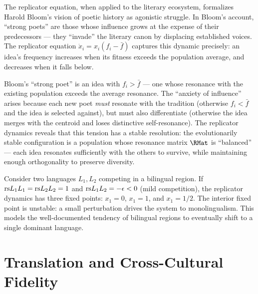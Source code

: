 \begin{interpretation}
\label{interp:ch17:bloom_invasive_species}
The replicator equation, when applied to the literary ecosystem, formalizes
Harold Bloom's vision of poetic history as agonistic struggle.  In Bloom's
account, ``strong poets'' are those whose influence grows at the expense of
their predecessors --- they ``invade'' the literary canon by displacing
established voices.  The replicator equation $\dot{x}_i = x_i(f_i -
\bar{f})$ captures this dynamic precisely: an idea's frequency increases
when its fitness exceeds the population average, and decreases when it
falls below.

Bloom's ``strong poet'' is an idea with $f_i > \bar{f}$ --- one whose
resonance with the existing population exceeds the average resonance.
The ``anxiety of influence'' arises because each new poet \emph{must}
resonate with the tradition (otherwise $f_i < \bar{f}$ and the idea is
selected against), but must also differentiate (otherwise the idea merges
with the centroid and loses distinctive self-resonance).  The replicator
dynamics reveals that this tension has a stable resolution: the
evolutionarily stable configuration is a population whose resonance matrix
$\RMat$ is ``balanced'' --- each idea resonates sufficiently with the
others to survive, while maintaining enough orthogonality to preserve
diversity.
\end{interpretation}

\begin{example}
Consider two languages $L_1, L_2$ competing in a bilingual region.  If
$\mathrm{rs}{L_1}{L_1} = \mathrm{rs}{L_2}{L_2} = 1$ and $\mathrm{rs}{L_1}{L_2} = -\epsilon < 0$
(mild competition), the replicator dynamics has three fixed points:
$x_1 = 0$, $x_1 = 1$, and $x_1 = 1/2$.  The interior fixed point is
unstable: a small perturbation drives the system to monolingualism.  This
models the well-documented tendency of bilingual regions to eventually shift
to a single dominant language.
\end{example}



\chapter{Translation and Cross-Cultural Fidelity}
\label{ch:translation}


